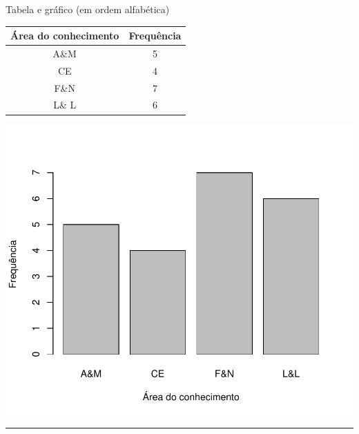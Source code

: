 \documentclass[a4paper,11pt,fleqn]{article}\usepackage[]{graphicx}\usepackage[]{color}
\newenvironment{knitrout}{}{} %
\theoremstyle{definition}
\begin{document}
\begin{compactenum}[5.]
\item Tabela e gráfico (em ordem alfabética)

\begin{multicols}{2}

  \begin{tabular}{cc}
    \hline
    \textbf{Área do conhecimento} & \textbf{Frequência} \\
    \hline
    A\&M & 5 \\
    CE & 4 \\
    F\&N & 7 \\
    L\& L & 6 \\
    \hline
  \end{tabular}

\columnbreak

\begin{knitrout}\small
{}\color{fgcolor}

{\centering \includegraphics[width=.45\textwidth]{figure/unnamed-chunk-1-1} 

}



\end{knitrout}
\end{multicols}

\end{compactenum}


\vspace{0.3cm}
\hrule
\vspace{0.3cm}
\end{document}
